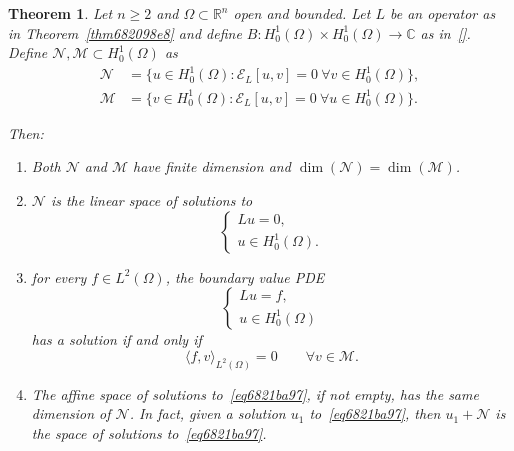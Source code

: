 \documentclass[a4paper,9pt]{amsart}
\newcommand{\scr}[1]{\mathscr{#1}}
\newcommand{\cal}[1]{\mathcal{#1}}
\newcommand{\R}{\mathbb{R}}	%
\newcommand{\C}{\mathbb{C}}	%
\theoremstyle{plain}
\newtheorem{theorem}[proposition]{Theorem}
\theoremstyle{definition}
\theoremstyle{remark}
\begin{document}
\begin{theorem}\label{thm6822fa7f}
	Let $n\ge 2$ and $\Omega\subset\R^n$ open and bounded.
	Let $L$ be an operator as in Theorem~\ref{thm682098e8} and define $B:H^1_0(\Omega)\times H^1_0(\Omega)\to\C$ 
	as in~\eqref{}.
	Define $\cal N,\cal M\subset H^1_0(\Omega)$ as
	\begin{equation}
	\begin{aligned}
		\cal N &= \{ u \in H^1_0(\Omega) : \scr E_L[u,v] = 0\ \forall v\in H^1_0(\Omega) \} , \\
		\cal M &= \{ v \in H^1_0(\Omega) : \scr E_L[u,v] = 0\ \forall u\in H^1_0(\Omega) \} .
	\end{aligned}
	\end{equation}
	
	Then:
	\begin{enumerate}
	\item
	Both $\cal N$ and $\cal M$ have finite dimension and $\dim(\cal N) = \dim(\cal M)$.
	\item
	$\cal N$ is the linear space of solutions to
	\begin{equation}\label{eq6821ba8f}
	\begin{cases}
		L u = 0 , \\
		u\in H^1_0(\Omega).
	\end{cases}
	\end{equation}
	\item
	for every $f\in L^2(\Omega)$, the boundary value PDE
	\begin{equation}\label{eq6821ba97}
	\begin{cases}
		L u = f , \\
		u\in H^1_0(\Omega) 
	\end{cases}
	\end{equation}
	has a solution if and only if 
	\begin{equation}\label{eq6821baaf}
		\langle f,v \rangle_{L^2(\Omega)} = 0
		\qquad\forall v\in \cal M .
	\end{equation}
	\item
	The affine space of solutions to~\eqref{eq6821ba97}, if not empty, has the same dimension of $\cal N$.
	In fact, given a solution $u_1$ to~\eqref{eq6821ba97}, then $u_1+\cal N$ is the space of solutions to~\eqref{eq6821ba97}.
	\end{enumerate}
\end{theorem}
\end{document}
